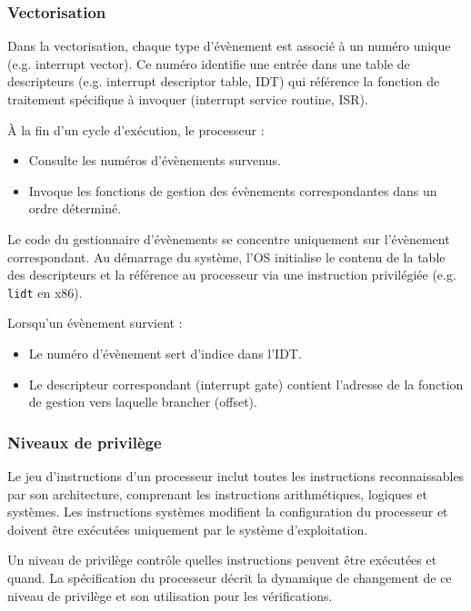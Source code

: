 \subsubsection{Vectorisation}

Dans la vectorisation, chaque type d'évènement est associé à un numéro unique (e.g. interrupt vector). Ce numéro identifie une entrée dans une table de descripteurs (e.g. interrupt descriptor table, IDT) qui référence la fonction de traitement spécifique à invoquer (interrupt service routine, ISR). 

À la fin d’un cycle d’exécution, le processeur :
\begin{itemize}
    \item Consulte les numéros d’évènements survenus.
    \item Invoque les fonctions de gestion des évènements correspondantes dans un ordre déterminé.
\end{itemize}

Le code du gestionnaire d’évènements se concentre uniquement sur l’évènement correspondant. Au démarrage du système, l’OS initialise le contenu de la table des descripteurs et la référence au processeur via une instruction privilégiée (e.g. \texttt{lidt} en x86).

Lorsqu’un évènement survient :
\begin{itemize}
    \item Le numéro d’évènement sert d’indice dans l’IDT.
    \item Le descripteur correspondant (interrupt gate) contient l’adresse de la fonction de gestion vers laquelle brancher (offset).
\end{itemize}


\subsubsection{Niveaux de privilège}

Le jeu d'instructions d'un processeur inclut toutes les instructions reconnaissables par son architecture, comprenant les instructions arithmétiques, logiques et systèmes. 
Les instructions systèmes modifient la configuration du processeur et doivent être exécutées uniquement par le système d'exploitation.

Un niveau de privilège contrôle quelles instructions peuvent être exécutées et quand. 
La spécification du processeur décrit la dynamique de changement de ce niveau de privilège et son utilisation pour les vérifications. 

